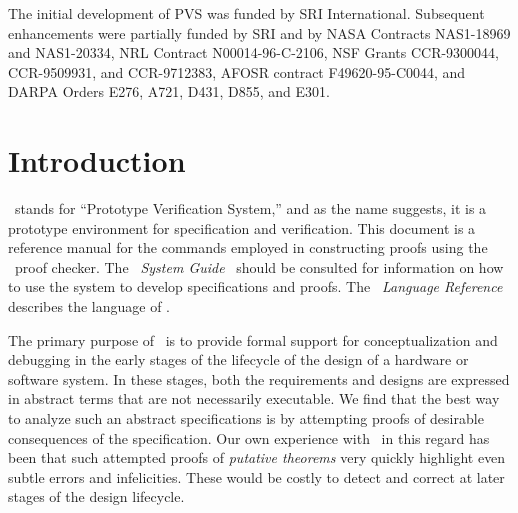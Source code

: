 \documentclass[12pt,twoside]{book}
\begin{document}
\pagestyle{fancy}
\renewcommand{\chaptermark}[1]{\markboth{\emph{#1}}{}\markright{\emph{#1}}}
\renewcommand{\sectionmark}[1]{\markright{\thesection \em \ #1}}
\lhead[\thepage]{\rightmark}
\cfoot{}
\rhead[\leftmark]{\thepage}
\setcounter{secnumdepth}{2} 
\setcounter{tocdepth}{3}
\thispagestyle{empty}

\newpage

\vspace*{6in}\noindent
The initial development of PVS was funded by SRI International.
Subsequent enhancements were partially funded by SRI and by NASA
Contracts NAS1-18969 and NAS1-20334, NRL Contract N00014-96-C-2106,
NSF Grants CCR-9300044, CCR-9509931, and CCR-9712383, AFOSR contract
F49620-95-C0044, and DARPA Orders E276, A721, D431, D855, and E301.
\newpage\setcounter{page}{1}

\tableofcontents
\cleardoublepage
{}
\setcounter{page}{1}

\chapter{Introduction}

\pvs\ stands for ``Prototype Verification System,'' and as the name suggests,
it is a prototype environment for specification and verification.  This document is a
reference manual for the commands employed in constructing proofs using the
\pvs\ proof checker.  The \emph{\pvs\ System Guide}~\cite{PVS:userguide} should
be consulted for information on how to use the system to develop
specifications and proofs.  The \emph{\pvs\ Language
Reference}~\cite{PVS:language} describes the language of \pvs\@. 

The primary purpose of \pvs\ is to provide formal support for
conceptualization and debugging in the early stages of the lifecycle of
the design of a hardware or software system.  In these stages, both the
requirements and designs are expressed in abstract terms that are not
necessarily executable.  We find that the best way to analyze such an
abstract specifications is by attempting proofs of desirable consequences
of the specification.  Our own experience with \pvs\ in this regard has
been that such attempted proofs of \emph{putative theorems} very quickly highlight even subtle errors and infelicities.
These would be costly to detect and correct at later stages of the design
lifecycle.
\end{document}
